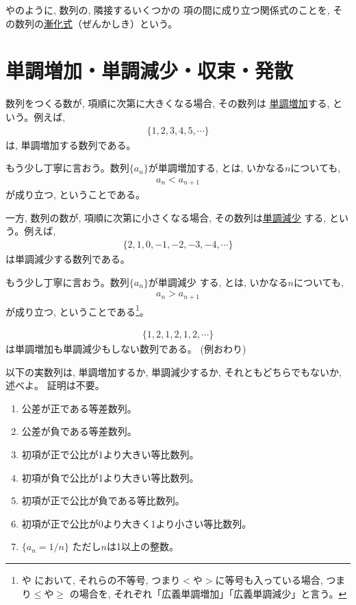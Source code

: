 やのように, 数列の, 隣接するいくつかの
項の間に成り立つ関係式のことを, その数列の\underline{漸化式}（ぜんかしき）という。\hv

\section{単調増加・単調減少・収束・発散}

数列をつくる数が, 項順に次第に大きくなる場合, その数列は
\underline{単調増加}する, という。例えば, 
\begin{eqnarray}\{1, 2, 3, 4, 5, \cdots\}\end{eqnarray}
は, 単調増加する数列である。

もう少し丁寧に言おう。数列$\{a_n\}$が単調増加する, とは, いかなる$n$についても, 
\begin{eqnarray}a_n<a_{n+1}\label{eq:series_increase}\end{eqnarray}
が成り立つ, ということである。

一方, 数列の数が, 項順に次第に小さくなる場合, その数列は\underline{単調減少}
する, という。例えば, 
\begin{eqnarray}\{2, 1, 0, -1, -2, -3, -4, \cdots\}\end{eqnarray}
は単調減少する数列である。

もう少し丁寧に言おう。数列$\{a_n\}$が単調減少
する, とは, いかなる$n$についても,
\begin{eqnarray}a_n>a_{n+1}\label{eq:series_decrease}\end{eqnarray}
が成り立つ, ということである\footnote{や
において, それらの不等号, つまり$<$や$>$に等号も入っている場合, つまり$\leq$や$\geq$
の場合を, それぞれ「広義単調増加」「広義単調減少」と言う。}。

\begin{exmpl}
\begin{eqnarray}\{1, 2, 1, 2, 1, 2, \cdots\}\end{eqnarray}
は単調増加も単調減少もしない数列である。
(例おわり)\end{exmpl}

\begin{q}\label{q:alg_series1} 
 以下の実数列は, 単調増加するか, 単調減少するか, それともどちらでもないか, 述べよ。
証明は不要。
\begin{enumerate}
\item 公差が正である等差数列。
\item 公差が負である等差数列。
\item 初項が正で公比が1より大きい等比数列。
\item 初項が負で公比が1より大きい等比数列。
\item 初項が正で公比が負である等比数列。
\item 初項が正で公比が0より大きく1より小さい等比数列。
\item $\{a_n=1/n\}$ ただし$n$は1以上の整数。
\end{enumerate}
\end{q}

